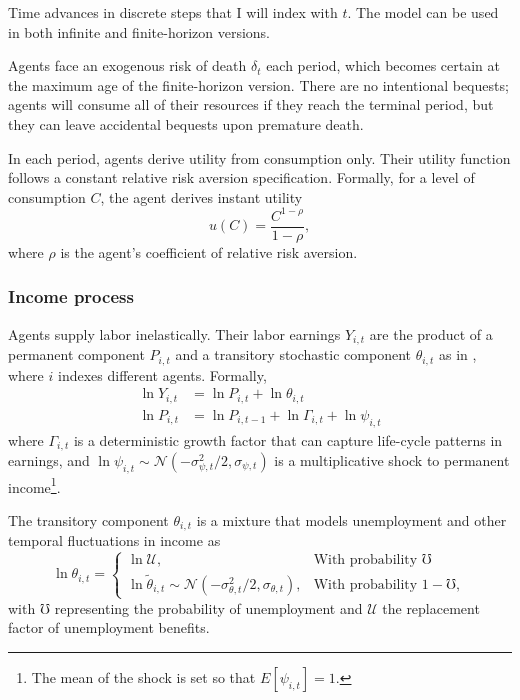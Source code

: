 \documentclass[./RiskyContrib.tex]{subfiles}
\begin{document}
Time advances in discrete steps that I will index with $t$. The model can
be used in both infinite and finite-horizon versions.

Agents face an exogenous risk of death $\delta_t$ each period, which becomes certain at the 
maximum age of the finite-horizon version. There are no intentional bequests; agents
will consume all of their resources if they reach the terminal period, but they can leave
accidental bequests upon premature death.

In each period, agents derive utility from consumption only. Their utility function
follows a constant relative risk aversion specification. Formally, for a level of 
consumption $C$, the agent derives instant utility
\begin{equation}
	u(C) = \frac{C^{1-\rho}}{1- \rho},
\end{equation}
where $\rho$ is the agent's coefficient of relative risk aversion.

\subsubsection{Income process}

Agents supply labor inelastically. Their labor earnings $Y_{i,t}$ are the product of a
permanent component $P_{i,t}$ and a transitory stochastic component $\theta_{i,t}$ as
in \cite{Carroll1997qje},  where $i$ indexes different agents. Formally,
\begin{equation*}
\begin{split}
\ln Y_{i,t} &= \ln P_{i,t} + \ln \theta_{i,t} \\
\ln P_{i,t} &= \ln P_{i,t-1} + \ln \Gamma_{i,t} + \ln \psi_{i,t}
\end{split}
\end{equation*}
where $\Gamma_{i,t}$ is a deterministic growth factor that can capture
life-cycle patterns in earnings, and
$\ln \psi_{i,t}\sim \mathcal{N}(-\sigma^2_{\psi,t}/2, \sigma_{\psi,t})$
is a multiplicative shock to permanent income\footnote{The mean of the shock is set so that $E[\psi_{i,t}] = 1$.}.

The transitory component $\theta_{i,t}$ is a mixture that models unemployment and
other temporal fluctuations in income as
\begin{equation*}
\ln\theta_{i,t} = \begin{cases}
\ln \mathcal{U}, & \text{With probability } \mho\\
\ln \tilde{\theta}_{i,t}\sim\mathcal{N}(-\sigma^2_{\theta,t}/2, \sigma_{\theta,t}), & \text{With probability } 1-\mho,
\end{cases}
\end{equation*}
with $\mho$ representing the probability of unemployment and $\mathcal{U}$ the replacement
factor of unemployment benefits.
\end{document}
